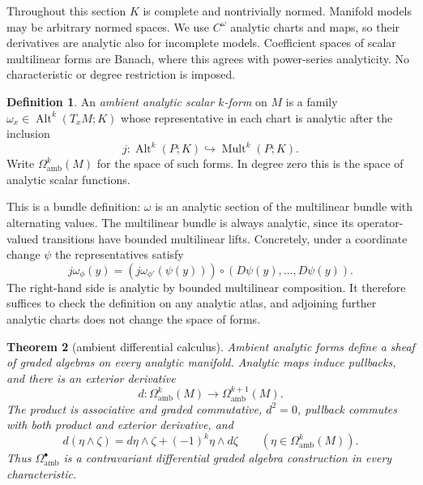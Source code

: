 \documentclass[11pt]{amsart}
\newtheorem{theorem}{Theorem}[section]
\theoremstyle{definition}
\newtheorem{definition}[theorem]{Definition}
\theoremstyle{remark}
\numberwithin{equation}{section}
\newcommand{\Alt}{\operatorname{Alt}}
\newcommand{\Mult}{\operatorname{Mult}}
\begin{document}
Throughout this section $K$ is complete and nontrivially normed. Manifold models may be arbitrary normed spaces. We use $C^\omega$ analytic charts and maps, so their derivatives are analytic also for incomplete models. Coefficient spaces of scalar multilinear forms are Banach, where this agrees with power-series analyticity. No characteristic or degree restriction is imposed.

\begin{definition}
An \emph{ambient analytic scalar $k$\nobreakdash-form} on $M$ is a family $\omega_x\in\Alt^k(T_xM;K)$ whose representative in each chart is analytic after the inclusion
\[
 j\colon\Alt^k(P;K)\hookrightarrow\Mult^k(P;K).
\]
Write $\Omega^k_{\mathrm{amb}}(M)$ for the space of such forms. In degree zero this is the space of analytic scalar functions.
\end{definition}

This is a bundle definition: $\omega$ is an analytic section of the multilinear bundle with alternating values. The multilinear bundle is always analytic, since its operator-valued transitions have bounded multilinear lifts. Concretely, under a coordinate change $\psi$ the representatives satisfy
\[
 j\omega_\phi(y)=
 (j\omega_{\phi'}(\psi(y)))\circ(D\psi(y),\ldots,D\psi(y)).
\]
The right-hand side is analytic by bounded multilinear composition. It therefore suffices to check the definition on any analytic atlas, and adjoining further analytic charts does not change the space of forms.

\begin{theorem}[ambient differential calculus]\label{thm:ambient-forms}
Ambient analytic forms define a sheaf of graded algebras on every analytic manifold. Analytic maps induce pullbacks, and there is an exterior derivative
\[
 d\colon\Omega^k_{\mathrm{amb}}(M)\longrightarrow\Omega^{k+1}_{\mathrm{amb}}(M).
\]
The product is associative and graded commutative, $d^2=0$, pullback commutes with both product and exterior derivative, and
\[
 d(\eta\wedge\zeta)=d\eta\wedge\zeta+(-1)^k\eta\wedge d\zeta
 \qquad(\eta\in\Omega^k_{\mathrm{amb}}(M)).
\]
Thus $\Omega^\bullet_{\mathrm{amb}}$ is a contravariant differential graded algebra construction in every characteristic.
\end{theorem}
\end{document}
